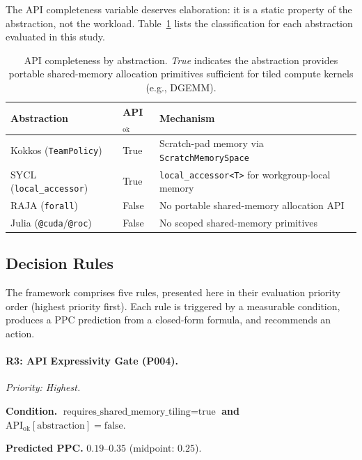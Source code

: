 The API completeness variable deserves elaboration: it is a static property
of the abstraction, not the workload. Table~\ref{tab:api_ok} lists the
classification for each abstraction evaluated in this study.

\begin{table}[t]
\centering
\caption{API completeness by abstraction. \textit{True} indicates the
abstraction provides portable shared-memory allocation primitives sufficient
for tiled compute kernels (e.g., DGEMM).}
\label{tab:api_ok}
\begin{tabular}{lll}
\hline
\textbf{Abstraction} & \textbf{API$_{\text{ok}}$} & \textbf{Mechanism} \\
\hline
Kokkos (\texttt{TeamPolicy})     & True  & Scratch-pad memory via \texttt{ScratchMemorySpace} \\
SYCL (\texttt{local\_accessor})  & True  & \texttt{local\_accessor<T>} for workgroup-local memory \\
RAJA (\texttt{forall})           & False & No portable shared-memory allocation API \\
Julia (\texttt{@cuda}/\texttt{@roc}) & False & No scoped shared-memory primitives \\
\hline
\end{tabular}
\end{table}

\subsection{Decision Rules}
\label{subsec:rules}

The framework comprises five rules, presented here in their evaluation
priority order (highest priority first). Each rule is triggered by a
measurable condition, produces a PPC prediction from a closed-form formula,
and recommends an action.

\paragraph{R3: API Expressivity Gate (P004).}
\textit{Priority: Highest.}

\noindent\textbf{Condition.}
$\text{requires\_shared\_memory\_tiling} = \text{true}$ \textbf{and}
$\text{API}_{\text{ok}}[\text{abstraction}] = \text{false}$.

\noindent\textbf{Predicted PPC.} $0.19$--$0.35$ (midpoint: $0.25$).

